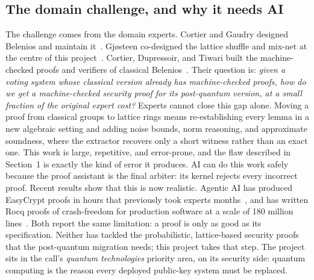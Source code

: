 \documentclass[11pt]{article}
\begin{document}
\subsection{The domain challenge, and why it needs AI}
The challenge comes from the domain experts. Cortier and Gaudry designed Belenios and maintain it~\cite{cortier2019belenios}.
Gj{\o}steen co-designed the lattice shuffle and mix-net at the centre of this
project~\cite{aranha2021shuffle,aranha2023mixnet}. Cortier, Dupressoir, and Tiwari built the machine-checked proofs
and verifiers of classical Belenios~\cite{cortier2017sp,cortier2018belenioseasycrypt,haines2019verified,287095}.
Their question is: \emph{given a voting system whose classical version already has machine-checked proofs, how do we
get a machine-checked security proof for its post-quantum version, at a small fraction of the original expert
cost?} Experts cannot close this gap alone. Moving a proof from classical groups to lattice rings means
re-establishing every lemma in a new algebraic setting and adding noise bounds, norm reasoning, and approximate
soundness, where the extractor recovers only a short witness rather than an exact one. This work is large, repetitive,
and error-prone, and the flaw described in Section~1 is exactly the kind of error it produces. AI can do this work safely
because the proof assistant is the final arbiter: its kernel rejects every incorrect proof.
Recent results show that this is now realistic. Agentic AI has produced EasyCrypt proofs in hours that previously
took experts months~\cite{ma2026shannonprover}, and has written Rocq proofs of crash-freedom for production software
at a scale of 180 million lines~\cite{anthropic2026formal}. Both report the same limitation: a proof is only as good
as its specification. Neither has tackled the probabilistic, lattice-based security proofs that the post-quantum
migration needs; this project takes that step. The project sits in the call's \emph{quantum technologies}
priority area, on its security side: quantum computing is the reason every deployed public-key system must be replaced.
\end{document}
